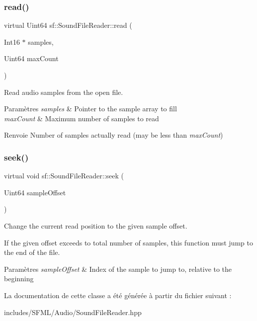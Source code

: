\subsubsection{\texorpdfstring{read()}{read()}}
{\footnotesize\ttfamily virtual Uint64 sf\+::\+Sound\+File\+Reader\+::read (\begin{DoxyParamCaption}\item[{Int16 $\ast$}]{samples,  }\item[{Uint64}]{max\+Count }\end{DoxyParamCaption})\hspace{0.3cm}{\ttfamily [pure virtual]}}



Read audio samples from the open file. 


\begin{DoxyParams}{Paramètres}
{\em samples} & Pointer to the sample array to fill \\
\hline
{\em max\+Count} & Maximum number of samples to read\\
\hline
\end{DoxyParams}
\begin{DoxyReturn}{Renvoie}
Number of samples actually read (may be less than {\itshape max\+Count}) 
\end{DoxyReturn}
\mbox{\label{classsf_1_1SoundFileReader_a1e18ade5ffe882bdfa20a2ebe7e2b015}} 
\subsubsection{\texorpdfstring{seek()}{seek()}}
{\footnotesize\ttfamily virtual void sf\+::\+Sound\+File\+Reader\+::seek (\begin{DoxyParamCaption}\item[{Uint64}]{sample\+Offset }\end{DoxyParamCaption})\hspace{0.3cm}{\ttfamily [pure virtual]}}



Change the current read position to the given sample offset. 

If the given offset exceeds to total number of samples, this function must jump to the end of the file.


\begin{DoxyParams}{Paramètres}
{\em sample\+Offset} & Index of the sample to jump to, relative to the beginning \\
\hline
\end{DoxyParams}


La documentation de cette classe a été générée à partir du fichier suivant \+:\begin{DoxyCompactItemize}
\item 
includes/\+S\+F\+M\+L/\+Audio/Sound\+File\+Reader.\+hpp\end{DoxyCompactItemize}
